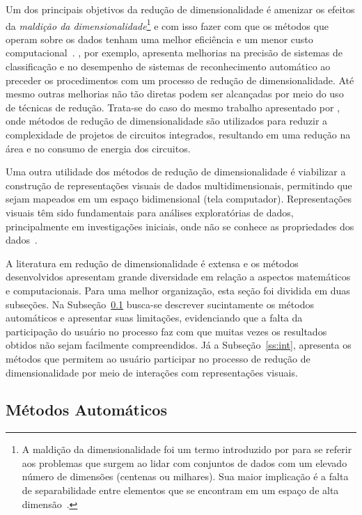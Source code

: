 Um dos principais objetivos da redução de dimensionalidade é
amenizar os efeitos da \emph{maldição da
dimensionalidade}\footnote{A maldição da dimensionalidade foi
    um termo introduzido por \citet{Bellman1961} para se
    referir aos problemas que surgem ao lidar com conjuntos
    de dados com um elevado número de dimensões (centenas ou
    milhares). Sua maior implicação é a falta de
separabilidade entre elementos que se encontram em um espaço
de alta dimensão~\cite{Kouiroukidis2011}.} e com isso fazer
com que os métodos que operam sobre os dados tenham uma
melhor eficiência e um menor custo
computacional~\cite{Maaten2009}.  \citet{Konig2000}, por
exemplo, apresenta melhorias na precisão de sistemas de
classificação e no desempenho de sistemas de reconhecimento
automático ao preceder os procedimentos com um processo de
redução de dimensionalidade. Até mesmo outras melhorias não
tão diretas podem ser alcançadas por meio do uso de técnicas
de redução.  Trata-se do caso do mesmo trabalho apresentado
por \citet{Konig2000}, onde métodos de redução de
dimensionalidade são utilizados para reduzir a complexidade
de projetos de circuitos integrados, resultando em uma
redução na área e no consumo de energia dos circuitos. 

Uma outra utilidade dos métodos de redução de
dimensionalidade é viabilizar a construção de representações
visuais de dados multidimensionais, permitindo que sejam
mapeados em um espaço bidimensional (tela computador).
Representações visuais têm sido fundamentais para análises
exploratórias de dados, principalmente em investigações
iniciais, onde não
se conhece as propriedades dos dados~\cite{Kaski2011}. 

A literatura em redução de dimensionalidade é extensa e os
métodos desenvolvidos apresentam grande diversidade em
relação a aspectos matemáticos e computacionais. Para 
uma melhor organização, esta seção foi dividida em duas
subseções. Na Subseção~\ref{ss:auto} busca-se descrever
sucintamente os métodos automáticos e apresentar suas
limitações, evidenciando que a falta da participação
do usuário no processo faz com que muitas vezes os
resultados obtidos não sejam facilmente compreendidos. Já a
Subseção~\ref{ss:int}, apresenta os métodos que permitem ao
usuário participar no processo de redução de
dimensionalidade por meio de interações com representações
visuais. 

\subsection{Métodos Automáticos}\label{ss:auto}

